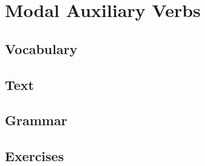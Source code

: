 \chapter{Modal Auxiliary Verbs}
\section*{Vocabulary}
\section*{Text}
\section*{Grammar}
\section*{Exercises}
